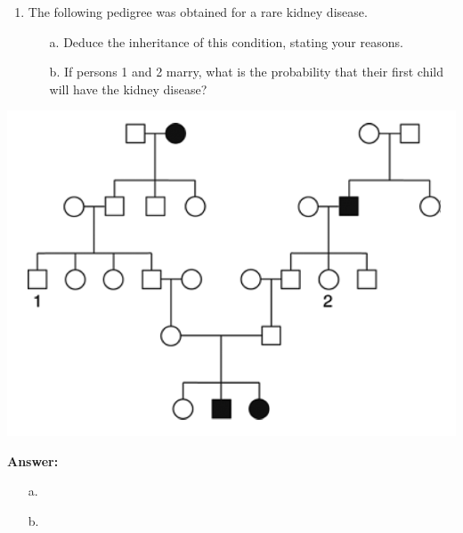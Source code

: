 \documentclass[11pt,]{article}
\providecommand{\tightlist}{%
  \setlength{\itemsep}{0pt}\setlength{\parskip}{0pt}}
\begin{document}
\begin{blackbox}

\begin{enumerate}
\def\labelenumi{\arabic{enumi}.}
\setcounter{enumi}{52}
\tightlist
\item
  The following pedigree was obtained for a rare kidney disease.

  \begin{enumerate} 
   \item[a.]{ Deduce the inheritance of this condition, stating your reasons. } 
   \item[b.]{ If persons 1 and 2 marry, what is the probability that their first child will have the kidney disease? } 
   \end{enumerate}
\end{enumerate}

\begin{center}\includegraphics[width=0.35\linewidth,]{input/53pedigree} \end{center}

\textbf{Answer:}

\begin{enumerate} 
 \item[a.]{  } 
 \item[b.]{  } 
 \end{enumerate}

\end{blackbox}
\end{document}
